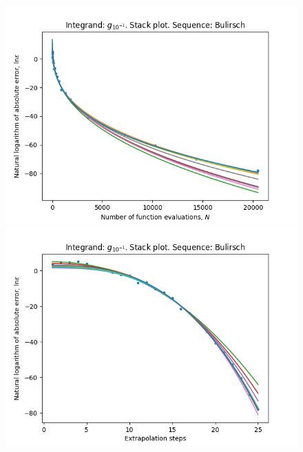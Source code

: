 \begin{figure}[H]
\centering
\begin{minipage}{0.45\textwidth}
\centering
\includegraphics[scale=0.45]{../results/romberg_plots/g_tenth_hp_bulirsch_stack.png}
\end{minipage}
\begin{minipage}{0.45\textwidth}
\centering
\includegraphics[scale=0.45]{../results/romberg_plots/g_tenth_hp_bulirsch_steps_stack.png}
\end{minipage}
\end{figure}

